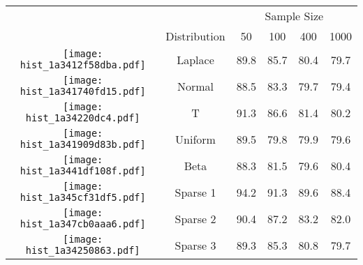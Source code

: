 
\begin{tabular}[t]{>{}cccccc}
\toprule
\multicolumn{2}{c}{  } & \multicolumn{4}{c}{Sample Size} \\
\cmidrule(l{3pt}r{3pt}){3-6}
  & Distribution & 50 & 100 & 400 & 1000\\
\midrule
\texttt{[image: hist\_1a3412f58dba.pdf]} & Laplace & 89.8 & 85.7 & 80.4 & 79.7\\
\texttt{[image: hist\_1a341740fd15.pdf]} & Normal & 88.5 & 83.3 & 79.7 & 79.4\\
\texttt{[image: hist\_1a34220dc4.pdf]} & T & 91.3 & 86.6 & 81.4 & 80.2\\
\texttt{[image: hist\_1a341909d83b.pdf]} & Uniform & 89.5 & 79.8 & 79.9 & 79.6\\
\texttt{[image: hist\_1a3441df108f.pdf]} & Beta & 88.3 & 81.5 & 79.6 & 80.4\\
\texttt{[image: hist\_1a345cf31df5.pdf]} & Sparse 1 & 94.2 & 91.3 & 89.6 & 88.4\\
\texttt{[image: hist\_1a347cb0aaa6.pdf]} & Sparse 2 & 90.4 & 87.2 & 83.2 & 82.0\\
\texttt{[image: hist\_1a34250863.pdf]} & Sparse 3 & 89.3 & 85.3 & 80.8 & 79.7\\
\bottomrule
\end{tabular}
